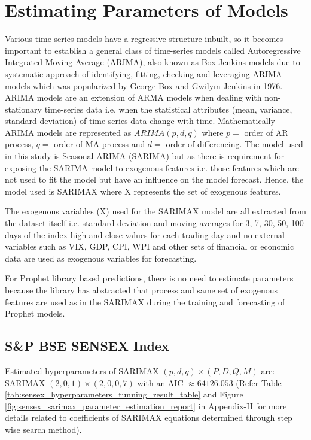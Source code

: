 \documentclass[conference]{IEEEtran}
\begin{document}
\section{Estimating Parameters of Models}
Various time-series models have a regressive structure inbuilt, so it becomes important to establish a general class of time-series models called Autoregressive Integrated Moving Average (ARIMA), also known as Box-Jenkins models due to systematic approach of identifying, fitting, checking and leveraging ARIMA models which was popularized by George Box and Gwilym Jenkins in 1976.
ARIMA models are an extension of ARMA models when dealing with non-stationary time-series data i.e. when the statistical attributes (mean, variance, standard deviation) of time-series data change with time. \newline
Mathematically ARIMA models are represented as $ARIMA(p, d, q)$ where $p = $ order of AR process, $q = $ order of MA process and $d = $ order of differencing.
The model used in this study is Seasonal ARIMA (SARIMA) but as there is requirement for exposing the SARIMA model to exogenous features i.e. those features which are not used to fit the model but have an influence on the model forecast. Hence, the model used is SARIMAX where X represents the set of exogenous features.

The exogenous variables (X) used for the SARIMAX model are all extracted from the dataset itself i.e. standard deviation and moving averages for 3, 7, 30, 50, 100 days of the index high and close values for each trading day and no external variables such as VIX, GDP, CPI, WPI and other sets of financial or economic data are used as exogenous variables for forecasting.

For Prophet\cite{b6} library based predictions, there is no need to estimate parameters because the library has abstracted that process and same set of exogenous features are used as in the SARIMAX during the training and forecasting of Prophet models.

\subsection{S\&P BSE SENSEX Index}
Estimated hyperparameters of SARIMAX $(p, d, q) \times (P, D, Q, M)$ are: SARIMAX $(2, 0, 1) \times (2, 0, 0, 7)$ with an AIC $\approx 64126.053$ (Refer Table \ref{tab:sensex_hyperparameters_tunning_result_table} and Figure \ref{fig:sensex_sarimax_parameter_estimation_report} in Appendix-II for more details related to coefficients of SARIMAX equations determined through step wise search method).
\end{document}
